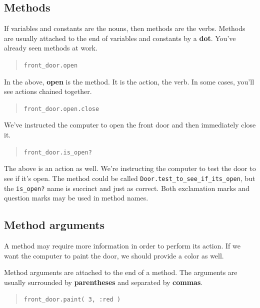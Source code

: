 \documentclass[10pt,twoside]{report}
\begin{document}
\subsection{Methods}



If variables and constants are the nouns, then methods are the
verbs. Methods are usually attached to the end of variables and
constants by a {\bf dot}.  You've already seen methods at work.

\begin{quote}
\lstinline[breaklines=true]|front_door.open|\end{quote}


In the above, {\bf open} is the method.  It is the action, the
verb. In some cases, you'll see actions chained together.

\begin{quote}
\lstinline[breaklines=true]|front_door.open.close|\end{quote}


We've instructed the computer to open the front door and then
immediately close it.

\begin{quote}
\lstinline[breaklines=true]|front_door.is_open?|\end{quote}


The above is an action as well.  We're instructing the computer to
test the door to see if it's open. The method could be called
\lstinline[breaklines=true]|Door.test_to_see_if_its_open|, but the
\lstinline[breaklines=true]|is_open?| name is succinct and just as
correct.  Both exclamation marks and question marks may be used in
method names.



\subsection{Method arguments}



A method may require more information in order to perform its action.
If we want the computer to paint the door, we should provide a color
as well.

Method arguments are attached to the end of a method.  The arguments
are usually surrounded by {\bf parentheses} and separated by {\bf
  commas}.

\begin{quote}
\lstinline[breaklines=true]|front_door.paint( 3, :red )|\end{quote}
\end{document}
